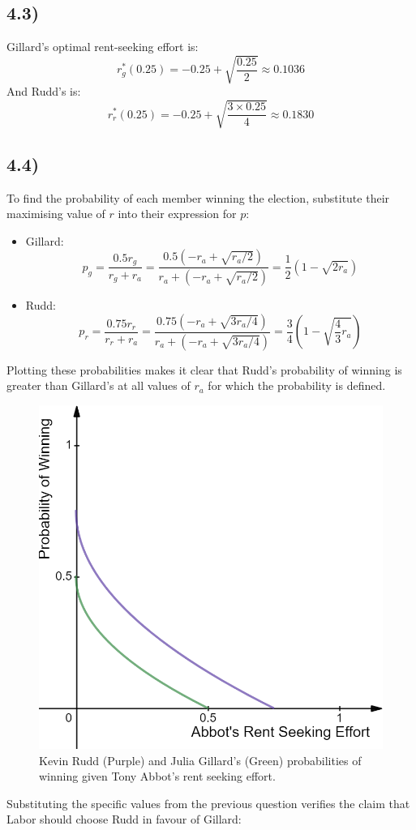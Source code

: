 \documentclass{article}
\begin{document}
\subsection*{4.3)}
Gillard's optimal rent-seeking effort is:
$$r_{g}^{*}(0.25) = -0.25 + \sqrt{\frac{0.25}{2}} \approx 0.1036$$
And Rudd's is:
$$r_{r}^{*}(0.25) = -0.25 + \sqrt{\frac{3 \times 0.25}{4}} \approx 0.1830$$

\subsection*{4.4)}
To find the probability of each member winning the election, substitute their maximising value of $r$ into their expression for $p$:
\begin{itemize}
    \item Gillard: $$p_{g} = \frac{0.5r_{g}}{r_{g} + r_{a}} = \frac{0.5(-r_{a} + \sqrt{{r_{a}}/{2}})}{r_{a} + (-r_{a} + \sqrt{{r_{a}}/{2}})} = \frac{1}{2} \left( 1 - \sqrt{2 r_{a}} \right)$$
    \item Rudd: $$p_{r} = \frac{0.75r_{r}}{r_{r} + r_{a}} = \frac{0.75(-r_{a} + \sqrt{{3r_{a}}/{4}})}{r_{a} + (-r_{a} + \sqrt{{3r_{a}}/{4}})} = \frac{3}{4} \left( 1 - \sqrt{\frac{4}{3} r_{a}} \right)$$
\end{itemize}
Plotting these probabilities makes it clear that Rudd's probability of winning is greater than Gillard's at all values of $r_{a}$ for which the probability is defined.
\begin{figure}[H]
    \centering
    \includegraphics[width=0.6\linewidth]{probabilities.png}
    \caption{Kevin Rudd (Purple) and Julia Gillard's (Green) probabilities of winning given Tony Abbot's rent seeking effort.}
    \label{fig:probabilities}
\end{figure}
Substituting the specific values from the previous question verifies the claim that Labor should choose Rudd in favour of Gillard:
\end{document}
